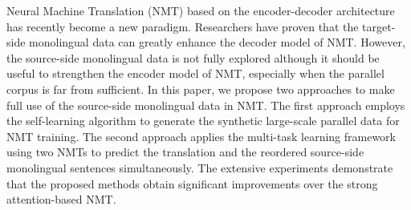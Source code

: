 Neural Machine Translation (NMT) based on the encoder-decoder architecture has recently become a new paradigm. Researchers have proven that the target-side monolingual data can greatly enhance the decoder model of NMT. However, the source-side monolingual data is not fully explored although it should be useful to strengthen the encoder model of NMT, especially when the parallel corpus is far from sufficient. In this paper, we propose two approaches to make full use of the source-side monolingual data in NMT. The first approach employs the self-learning algorithm to generate the synthetic large-scale parallel data for NMT training. The second approach applies the multi-task learning framework using two NMTs to predict the translation and the reordered source-side monolingual sentences simultaneously. The extensive experiments demonstrate that the proposed methods obtain significant improvements over the strong attention-based NMT.
